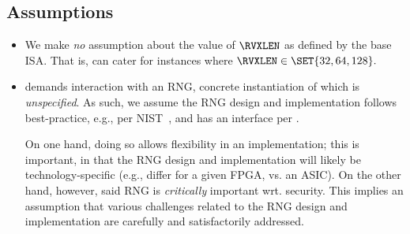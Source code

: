 
\subsection{Assumptions}
\label{sec:bg:assumption}

\begin{itemize}

\item We make {\em no} assumption about the value of $\RVXLEN$ as defined
      by the base ISA.  That is, \XCRYPTO can cater for instances where
      $
      \RVXLEN \in \SET{ 32, 64, 128 } .
      $

\item \XCRYPTO demands interaction with an RNG, concrete instantiation of 
      which is {\em unspecified}.  As such, we assume the RNG design and 
      implementation follows best-practice,
      e.g., per NIST~\cite{SCARV:NIST:SP:800_90a,SCARV:NIST:SP:800_90b,SCARV:NIST:SP:800_90c},
      and has an interface per \cite[Section 6.4]{SCARV:NIST:SP:800_90c}.

      On one hand, doing so allows flexibility in an implementation; this 
      is important, in that the RNG design and implementation will likely 
      be technology-specific 
      (e.g., differ for a given FPGA, vs. an ASIC).  
      On the other hand, however, said RNG is {\em critically} important
      wrt. security.  This implies an assumption that various challenges 
      related to the RNG design and implementation are carefully and 
      satisfactorily addressed.

\end{itemize}

